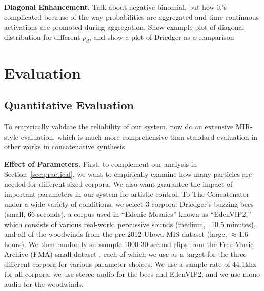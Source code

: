 \documentclass{article}
\begin{document}
\textbf{Diagonal Enhancement.} Talk about negative binomial, but how it's complicated because of the way probabilities are aggregated and time-continuous activations are promoted during aggregation.  Show example plot of diagonal distribution for different $p_d$, and show a plot of Driedger as a comparison





\section{Evaluation}

\subsection{Quantitative Evaluation}
\label{sec:quantitativeevaluation}

To empirically validate the reliability of our system, now do an extensive MIR-style evaluation, which is much more comprehensive than standard evaluation in other works in concatenative synthesis.

\textbf{Effect of Parameters.} First, to complement our analysis in Section~\ref{sec:practical}, we want to empirically examine how many particles are needed for different sized corpora.  We also want guarantee the impact of important parameters in our system for artistic control.  To The Concatenator under a wide variety of conditions, we select 3 corpora: Driedger's buzzing bees (small, 66 seconds), a corpus used in ``Edenic Mosaics''\cite{cantil2021} known as ``EdenVIP2,'' which consists of various real-world percussive sounds (medium, ~10.5 minutes), and all of the woodwinds from the pre-2012 UIowa MIS dataset \cite{uiowadataset} (large, $\approx$1.6 hours).  We then randomly subsample 1000 30 second clips from the Free Music Archive (FMA)-small dataset \cite{fma_dataset}, each of which we use as a target for the three different corpora for various parameter choices.  We use a sample rate of 44.1khz for all corpora, we use stereo audio for the bees and EdenVIP2, and we use mono audio for the woodwinds.
\end{document}
